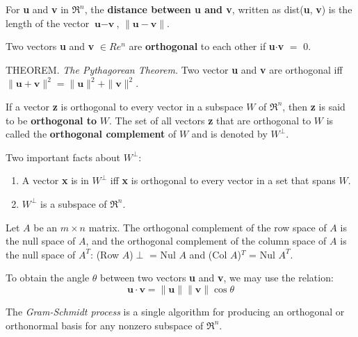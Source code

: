 \documentclass{article}
\begin{document}
\hfill \newline For \textbf{u} and \textbf{v} in $\Re^n$, the \textbf{distance between u and v}, written as dist(\textbf{u}, \textbf{v}) is the length of the vector $\textbf{u}-\textbf{v}$, $\|\textbf{u}-\textbf{v}\|$.

\hfill \newline Two vectors \textbf{u} and \textbf{v} $\in Re^n$ are \textbf{orthogonal} to each other if \textbf{u}$\cdot$\textbf{v} $=$ 0.

\hfill \newline THEOREM. \textit{The Pythagorean Theorem.} Two vector \textbf{u} and \textbf{v} are orthogonal iff $\|\textbf{u}+\textbf{v}\|^2=\|\textbf{u}\|^2 + \|\textbf{v}\|^2$.

\hfill \newline If a vector \textbf{z} is orthogonal to every vector in a subspace $W$ of $\Re^n$, then \textbf{z} is said to be \textbf{orthogonal to} $W$. The set of all vectors \textbf{z} that are orthogonal to $W$ is called the \textbf{orthogonal complement} of $W$ and is denoted by $W^\perp$.

\hfill \newline Two important facts about $W^\perp$:
\begin{enumerate}
    \item A vector \textbf{x} is in $W^\perp$ iff \textbf{x} is orthogonal to every vector in a set that spans $W$.
    \item $W^\perp$ is a subspace of $\Re^n$.
\end{enumerate}

\hfill \newline Let $A$ be an $m \times n$ matrix. The orthogonal complement of the row space of $A$ is the null space of $A$, and the orthogonal complement of the column space of $A$ is the null space of $A^T$: (Row $A$)$\perp$ = Nul $A$ and (Col $A$)$^T$ = Nul $A^T$.

\hfill \newline To obtain the angle $\theta$ between two vectors \textbf{u} and \textbf{v}, we may use the relation: 
\begin{equation}
    \textbf{u}\cdot\textbf{v} = \|\textbf{u}\|\|\textbf{v}\| \cos\theta
\end{equation}

\hfill \newline The \textit{Gram-Schmidt process} is a single algorithm for producing an orthogonal or orthonormal basis for any nonzero subspace of $\Re^n$. 
\end{document}
